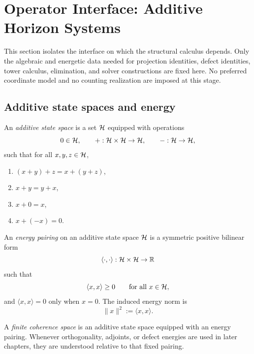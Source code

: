 \section{Operator Interface: Additive Horizon Systems}
\label{sec:bedrock}

This section isolates the interface on which the structural calculus depends.
Only the algebraic and energetic data needed for projection identities, defect
identities, tower calculus, elimination, and solver constructions are fixed
here. No preferred coordinate model and no counting realization are imposed at
this stage.

\subsection{Additive state spaces and energy}
\label{subsec:algebraic-foundations}

\begin{definition}\label{def:vector-space}
An \emph{additive state space} is a set $\mathcal{H}$ equipped with operations
\[
0 \in \mathcal{H},
\qquad
+ : \mathcal{H} \times \mathcal{H} \to \mathcal{H},
\qquad
- : \mathcal{H} \to \mathcal{H},
\]
such that for all $x,y,z \in \mathcal{H}$,
\begin{enumerate}[label=(\roman*), itemsep=0.2em]
\item $(x+y)+z = x+(y+z)$,
\item $x+y = y+x$,
\item $x+0 = x$,
\item $x+(-x)=0$.
\end{enumerate}
\end{definition}

\begin{definition}\label{def:inner-product}
An \emph{energy pairing} on an additive state space $\mathcal{H}$ is a symmetric
positive bilinear form
\[
\langle \cdot,\cdot\rangle : \mathcal{H} \times \mathcal{H} \to \mathbb{R}
\]
such that
\[
\langle x,x\rangle \ge 0
\qquad\text{for all }x\in\mathcal{H},
\]
and $\langle x,x\rangle = 0$ only when $x=0$.
The induced energy norm is
\[
\|x\|^2 := \langle x,x\rangle.
\]
\end{definition}

\begin{definition}\label{def:hilbert-space}
A \emph{finite coherence space} is an additive state space equipped with an
energy pairing. Whenever orthogonality, adjoints, or defect energies are used
in later chapters, they are understood relative to that fixed pairing.
\end{definition}

